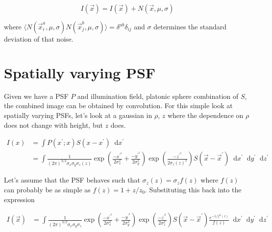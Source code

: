 \documentclass[preprint,amsmath,amssymb]{revtex4}
\newcommand{\pr}[1]{#1^{\prime}}
\newcommand*\diff{\mathop{}\!\mathrm{d}}
\begin{document}
\begin{equation}
    I(\vec{x}) = I(\vec{x}) + N(\vec{x}, \mu, \sigma)
\end{equation}

where $\langle N(\vec{x}^a_i, \mu, \sigma) N(\vec{x}^b_j, \mu, \sigma)\rangle =
\delta^{ab} \delta_{ij}$ and $\sigma$ determines the standard deviation of that
noise.

\section{Spatially varying PSF}

Given we have a PSF $P$ and illumination field, platonic sphere combination of
$S$, the combined image can be obtained by convolution.  For this simple look
at spatially varying PSFs, let's look at a gaussian in $\rho$, $z$ where the
dependence on $\rho$ does not change with height, but $z$ does.

\begin{align*}
    I(x) &= \int P(\pr{x}; x) S(x - \pr{x}) \diff \pr{x} \\
         &= \int \frac{1}{(2\pi)^{3/2} \sigma_x\sigma_y\sigma_z(z)} \exp\left(\frac{-\pr{x}^2}{2\sigma_x^2} + \frac{-\pr{y}^2}{2\sigma_y^2}\right) \exp\left(\frac{-\pr{z}^2}{2\sigma_z(z)^2}\right) S(\vec{x}-\pr{\vec{x}}) \diff \pr{x} \diff \pr{y} \diff \pr{z}
\end{align*}

Let's assume that the PSF behaves such that $\sigma_z(z) = \sigma_z f(z)$ where
$f(z)$ can probably be as simple as $f(z) = 1 + z/z_0$.  Substituting this back
into the expression

\begin{align*}
    I(\vec{x}) &= \int \frac{1}{(2\pi)^{3/2} \sigma_x\sigma_y\sigma_z} \exp\left(\frac{-\pr{x}^2}{2\sigma_x^2} + \frac{-\pr{y}^2}{2\sigma_y^2}\right) \exp\left(\frac{-\pr{z}^2}{2\sigma_z^2}\right) S(\vec{x}-\pr{\vec{x}}) \frac{e^{-1/f^2(z)}}{f(z)} \diff \pr{x} \diff \pr{y} \diff \pr{z}
\end{align*}



\end{document}
